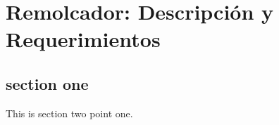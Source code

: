 \chapter{Remolcador: Descripción y Requerimientos}

\section{section one}
This is section two point one.